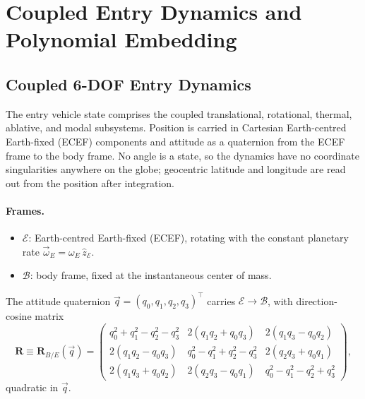 %

\section{Coupled Entry Dynamics and Polynomial Embedding}
\label{apx:dyn}

\subsection{Coupled 6-DOF Entry Dynamics}
\label{sub:apx_dyn_6dof}

The entry vehicle state comprises the coupled translational, rotational,
thermal, ablative, and modal subsystems. Position is carried in Cartesian
Earth-centred Earth-fixed (ECEF) components and attitude as a quaternion from
the ECEF frame to the body frame. No angle is a state, so the dynamics have no
coordinate singularities anywhere on the globe; geocentric latitude and
longitude are read out from the position after integration.

\paragraph{Frames.}
\begin{itemize}
  \item $\mathcal E$: Earth-centred Earth-fixed (ECEF), rotating with the
        constant planetary rate $\vec\omega_E = \omega_E\,\hat z_{\mathcal E}$.
  \item $\mathcal B$: body frame, fixed at the instantaneous center of mass.
\end{itemize}

The attitude quaternion $\vec q = (q_0, q_1, q_2, q_3)^\top$ carries
$\mathcal E \to \mathcal B$, with direction-cosine matrix
\begin{equation}
\label{eq:dcm}
\mathbf R \equiv \mathbf R_{B/E}(\vec q)=
\begin{pmatrix}
q_0^2+q_1^2-q_2^2-q_3^2 & 2(q_1q_2+q_0q_3) & 2(q_1q_3-q_0q_2)\\
2(q_1q_2-q_0q_3) & q_0^2-q_1^2+q_2^2-q_3^2 & 2(q_2q_3+q_0q_1)\\
2(q_1q_3+q_0q_2) & 2(q_2q_3-q_0q_1) & q_0^2-q_1^2-q_2^2+q_3^2
\end{pmatrix},
\end{equation}
quadratic in $\vec q$.

